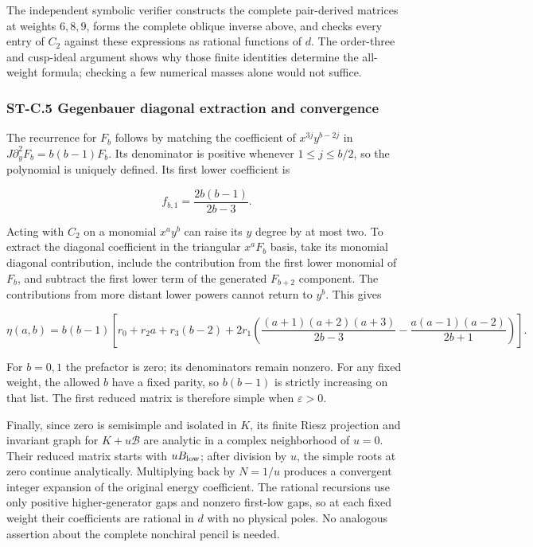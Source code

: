 \documentclass[a4paper,11pt]{article}
\numberwithin{equation}{section}
\begin{document}
The independent symbolic verifier constructs the complete pair-derived matrices at weights \(6,8,9\), forms the complete oblique inverse above, and checks every entry of \(C_2\) against these expressions as rational functions of \(d\). The order-three and cusp-ideal argument shows why those finite identities determine the all-weight formula; checking a few numerical masses alone would not suffice.

\hypertarget{st-c.5-gegenbauer-diagonal-extraction-and-convergence}{%
\subsubsection{ST-C.5 Gegenbauer diagonal extraction and convergence}\label{st-c.5-gegenbauer-diagonal-extraction-and-convergence}}

The recurrence for \(F_b\) follows by matching the coefficient of \(x^{3j}y^{b-2j}\) in \(J\partial_y^2F_b=b(b-1)F_b\). Its denominator is positive whenever \(1\leq j\leq b/2\), so the polynomial is uniquely defined. Its first lower coefficient is

\[
f_{b,1}=\frac{2b(b-1)}{2b-3}.
\]

Acting with \(C_2\) on a monomial \(x^ay^b\) can raise its \(y\) degree by at most two. To extract the diagonal coefficient in the triangular \(x^aF_b\) basis, take its monomial diagonal contribution, include the contribution from the first lower monomial of \(F_b\), and subtract the first lower term of the generated \(F_{b+2}\) component. The contributions from more distant lower powers cannot return to \(y^b\). This gives

\[
\eta(a,b)=b(b-1)\left[
r_0+r_2a+r_3(b-2)+
2r_1\left(
\frac{(a+1)(a+2)(a+3)}{2b-3}
-\frac{a(a-1)(a-2)}{2b+1}\right)\right].
\]

For \(b=0,1\) the prefactor is zero; its denominators remain nonzero. For any fixed weight, the allowed \(b\) have a fixed parity, so \(b(b-1)\) is strictly increasing on that list. The first reduced matrix is therefore simple when \(\varepsilon>0\).

Finally, since zero is semisimple and isolated in \(K\), its finite Riesz projection and invariant graph for \(K+u\mathscr B\) are analytic in a complex neighborhood of \(u=0\). Their reduced matrix starts with \(uB_{\rm low}\); after division by \(u\), the simple roots at zero continue analytically. Multiplying back by \(N=1/u\) produces a convergent integer expansion of the original energy coefficient. The rational recursions use only positive higher-generator gaps and nonzero first-low gaps, so at each fixed weight their coefficients are rational in \(d\) with no physical poles. No analogous assertion about the complete nonchiral pencil is needed.
\end{document}
